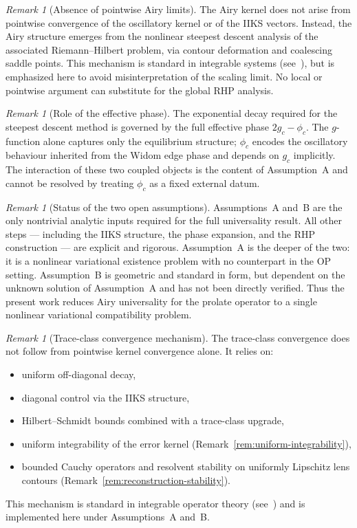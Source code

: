 \documentclass[12pt,a4paper]{amsart}
\theoremstyle{definition}
\theoremstyle{remark}
\newtheorem{remark}[theorem]{Remark}
\begin{document}
\begin{remark}[Absence of pointwise Airy limits]
\label{rem:no-pointwise-2}
The Airy kernel does not arise from pointwise convergence of the
oscillatory kernel or of the IIKS vectors.
Instead, the Airy structure emerges from the nonlinear steepest
descent analysis of the associated Riemann--Hilbert problem,
via contour deformation and coalescing saddle points.
This mechanism is standard in integrable systems
(see~\cite{Deift1999}), but is emphasized here to avoid
misinterpretation of the scaling limit.
No local or pointwise argument can substitute for the global
RHP analysis.
\end{remark}

\begin{remark}[Role of the effective phase]
\label{rem:phase-clarification}
The exponential decay required for the steepest descent method
is governed by the full effective phase $2g_c - \phi_c$.
The $g$-function alone captures only the equilibrium structure;
$\phi_c$ encodes the oscillatory behaviour inherited from the
Widom edge phase and depends on $g_c$ implicitly.
The interaction of these two coupled objects is the content of
Assumption~A and cannot be resolved by treating $\phi_c$ as a
fixed external datum.
\end{remark}

\begin{remark}[Status of the two open assumptions]
\label{rem:assumption-status}
Assumptions~A and~B are the only nontrivial analytic inputs
required for the full universality result.
All other steps --- including the IIKS structure, the phase
expansion, and the RHP construction --- are explicit and rigorous.
Assumption~A is the deeper of the two: it is a nonlinear variational
existence problem with no counterpart in the OP setting.
Assumption~B is geometric and standard in form, but dependent on
the unknown solution of Assumption~A and has not been directly
verified.
Thus the present work reduces Airy universality for the prolate
operator to a single nonlinear variational compatibility problem.
\end{remark}

\begin{remark}[Trace-class convergence mechanism]
\label{rem:trace-mechanism}
The trace-class convergence does not follow from pointwise kernel
convergence alone. It relies on:
\begin{itemize}
\item uniform off-diagonal decay,
\item diagonal control via the IIKS structure,
\item Hilbert--Schmidt bounds combined with a trace-class upgrade,
\item uniform integrability of the error kernel
  (Remark~\ref{rem:uniform-integrability}),
\item bounded Cauchy operators and resolvent stability on uniformly
  Lipschitz lens contours
  (Remark~\ref{rem:reconstruction-stability}).
\end{itemize}
This mechanism is standard in integrable operator theory
(see~\cite{ItsIzergin1990,Kato1966}) and is implemented here
under Assumptions~A and~B.
\end{remark}
\end{document}
